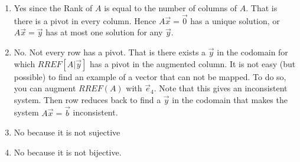 
\begin{SaveQuestion}[
        key=ch2-injsur-3to4-sbg,
        prompt={Consider the Linear transformation $T:\bbR^3\to \bbR^4$ given by $T(\vec x) = A \vec x$ where \\ $A= \begin{bmatrix} 1 & 1 & 1 \\ -1 & 0 & 1 \\ 2 & -1 & 0 \\ 2 & 0 & 2 \\ \end{bmatrix}$ with REF$(A) = \begin{bmatrix} 1 & 1 & 1\\ 0 & 1 & 2\\ 0 & 0 & 1\\ 0 & 0 & 0\\ \end{bmatrix}$. \begin{enumerate} \item Is $T$ injective, why? If not, give an example of two different input vectors that are mapped to the same output. \item Is $T$ surjective, why? If not, can you give an example of a vector in the codomain which can not be reached by $T$. \item Is $T$ bijective, why? \item Is $T$ invertible, why? \end{enumerate}}
][ch2-CON-surinj] %
    \begin{enumerate}
            \item Yes since the Rank of $A$ is equal to the number of columns of $A$. That is there is a pivot in every column. Hence $A\vec x=\vec 0$ has a unique solution, or $A\vec x=\vec y$ has at most one solution for any $\vec y$. 
            \item No. Not every row has a pivot. That is there exists a $\vec y$ in the codomain for which $RREF[A|\vec y]$ has a pivot in the augmented column. It is not easy (but possible) to find an example of a vector that can not be mapped. To do so, you can augment $RREF(A)$ with $\vec e_4$. Note that this gives an inconsistent system. Then row reduces back to find a  $\vec y$ in the codomain that makes the system $A\vec x=\vec b$ inconsistent. 
            \item No because it is not sujective
            \item No because it is not bijective. 
        \end{enumerate}
\end{SaveQuestion}


